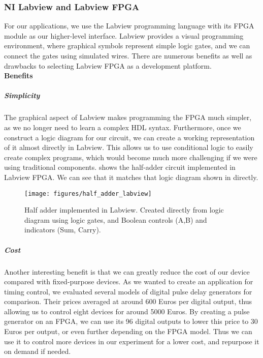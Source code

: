 \subsubsection{NI Labview and Labview FPGA}
\label{ni_labview_and_Labview_fpga} 

For our applications, we use the Labview programming language with its FPGA
module as our higher-level interface.  Labview provides a visual programming
environment, where graphical symbols represent simple logic gates, and we can
connect the gates using simulated wires.  There are numerous benefits as well
as drawbacks to selecting Labview FPGA as a development platform.
\\[2em]

\noindent
\Large
\textbf{Benefits}
\normalsize
 
\subparagraph{Simplicity}

The graphical aspect of Labview makes programming the FPGA much simpler, as we
no longer need to learn a complex HDL syntax.  Furthermore,  once we construct
a logic diagram for our circuit, we can create a working representation of it
almost directly in Labview.  This allows us to use conditional logic to easily create complex programs, which would become much more challenging if we were using traditional components.   shows the
half-adder circuit implemented in Labview FPGA.  We can see that it matches
that logic diagram shown in  directly.

\begin{figure}[!ht] 
 \centering 
 \texttt{[image: figures/half\_adder\_labview]} 
 \caption[Half Adder in Labview]{Half adder implemented in Labview.  Created directly from logic diagram using logic gates, and Boolean controls (A,B) and indicators (Sum, Carry).} 
 \label{fig:half_adder_labview} 
\end{figure}

\subparagraph{Cost} 

Another interesting benefit is that we can greatly reduce the cost of our
device compared with fixed-purpose devices.  As we wanted to create an
application for timing control, we evaluated several models of digital pulse
delay generators for comparison.  Their prices averaged at around 600 Euros
per digital output, thus allowing us to control eight devices for around 5000
Euros.  By creating a pulse generator on an FPGA, we can use its 96 digital
outputs to lower this price to 30 Euros per output, or even further depending
on the FPGA model.  Thus we can use it to control more devices in our experiment for a lower cost, and repurpose it on demand if needed.


